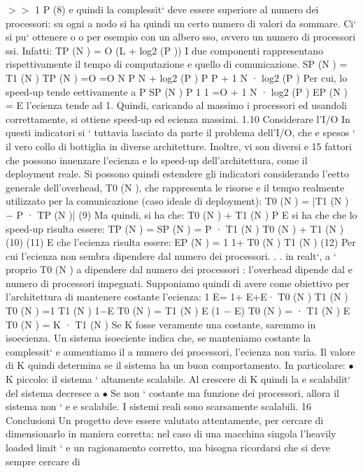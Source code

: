 \documentclass[a4paper,12pt]{article}
\begin{document}
$>$$>$ 1
P
(8)
e quindi la complessit` deve essere superiore al numero dei processori: su ogni
a
nodo si ha quindi un certo numero di valori da sommare. Ci` si pu` ottenere
o
o
per esempio con un albero sso, ovvero un numero di processori ssi. Infatti:
TP (N ) = O (L + log2 (P ))
I due componenti rappresentano rispettivamente il tempo di computazione e
quello di comunicazione.
SP (N ) =
T1 (N )
TP (N )
=O
=O
N
P
N
+ log2 (P )
P
P
+
1
N · log2 (P )
Per cui, lo speed-up tende eettivamente a P
SP (N )
P
1
1
=O
+
1 N · log2 (P )
EP (N ) =
E l'ecienza tende ad 1. Quindi, caricando al massimo i processori ed usandoli
correttamente, si ottiene speed-up ed ecienza massimi.
1.10
Considerare l'I/O
In questi indicatori si ` tuttavia lasciato da parte il problema dell'I/O, che
e
spesos ` il vero collo di bottiglia in diverse architetture. Inoltre, vi son diversi
e
15
\newpage
fattori che possono inuenzare l'ecienza e lo speed-up dell'architettura, come
il deployment reale. Si possono quindi estendere gli indicatori considerando
l'eetto generale dell'overhead, T0 (N ), che rappresenta le risorse e il tempo
realmente utilizzato per la comunicazione (caso ideale di deployment):
T0 (N ) = |T1 (N ) $-$ P · TP (N )|
(9)
Ma quindi, si ha che:
T0 (N ) + T1 (N )
P
E si ha che che lo speed-up risulta essere:
TP (N ) =
SP (N ) =
P · T1 (N )
T0 (N ) + T1 (N )
(10)
(11)
E che l'ecienza risulta essere:
EP (N ) =
1
1+
T0 (N )
T1 (N )
(12)
Per cui l'ecienza non sembra dipendere dal numero dei processori. . . in realt`,
a
` proprio T0 (N ) a dipendere dal numero dei processori : l'overhead dipende dal
e
numero di processori impegnati.
Supponiamo quindi di avere come obiettivo per l'architettura di mantenere
costante l'ecienza:
1
E=
1+
E+E·
T0 (N )
T1 (N )
T0 (N )
=1
T1 (N )
1$-$E
T0 (N )
=
T1 (N )
E
(1 $-$ E)
T0 (N ) =
· T1 (N )
E
T0 (N ) = K · T1 (N )
Se K fosse veramente una costante, saremmo in isoecienza. Un sistema isoeciente indica che, se manteniamo costante la
complessit` e aumentiamo il
a
numero dei processori, l'ecienza non varia. Il valore di K quindi determina se
il sistema ha un buon comportamento. In particolare:
$\bullet$ K piccolo: il sistema ` altamente scalabile. Al crescere di K quindi la
e
scalabilit` del sistema decresce
a
$\bullet$ Se non ` costante ma funzione dei processori, allora il sistema non `
e
e
scalabile.
I sistemi reali sono scarsamente scalabili.
16
Conclusioni
Un progetto deve essere valutato attentamente, per cercare di dimensionarlo
in maniera corretta: nel caso di una macchina singola l'heavily loaded limit `
e
un ragionamento corretto, ma bisogna ricordarsi che si deve sempre cercare di
$$
\end{document}
